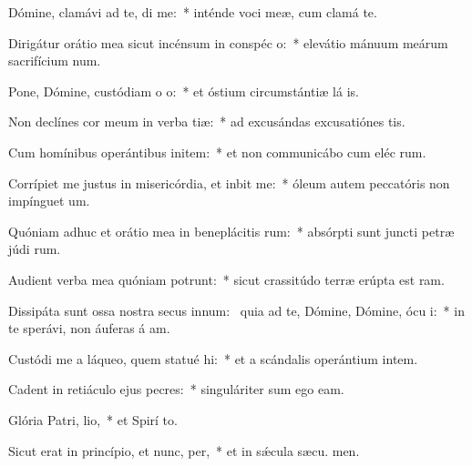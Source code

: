 \item Dómine, clamávi ad te, di me:~* inténde voci meæ, cum clamá  te.
\item Dirigátur orátio mea sicut incénsum in conspéc o:~* elevátio mánuum meárum sacrifícium num.
\item Pone, Dómine, custódiam o o:~* et óstium circumstántiæ lá is.
\item Non declínes cor meum in verba tiæ:~* ad excusándas excusatiónes  tis.
\item Cum homínibus operántibus initem:~* et non communicábo cum eléc rum.
\item Corrípiet me justus in misericórdia, et inbit me:~* óleum autem peccatóris non impínguet  um.
\item Quóniam adhuc et orátio mea in beneplácitis rum:~* absórpti sunt juncti petræ júdi rum.
\item Audient verba mea quóniam potrunt:~* sicut crassitúdo terræ erúpta est  ram.
\item Dissipáta sunt ossa nostra secus innum:~\pscross{} quia ad te, Dómine, Dómine, ócu i:~* in te sperávi, non áuferas á am.
\item Custódi me a láqueo, quem statué hi:~* et a scándalis operántium intem.
\item Cadent in retiáculo ejus pecres:~* singuláriter sum ego  eam.
\item Glória Patri,  lio,~* et Spirí to.
\item Sicut erat in princípio, et nunc,  per,~* et in sǽcula sæcu. men.

